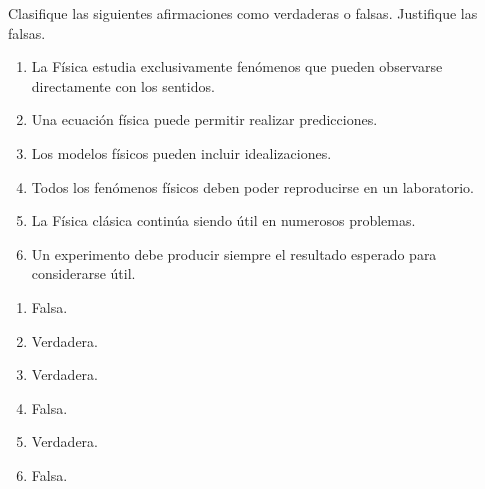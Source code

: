 \begin{ejercicio}
Clasifique las siguientes afirmaciones como verdaderas o falsas. Justifique las falsas.

\begin{enumerate}[label=\alph*)]
    \item La Física estudia exclusivamente fenómenos que pueden observarse directamente con los sentidos.
    \item Una ecuación física puede permitir realizar predicciones.
    \item Los modelos físicos pueden incluir idealizaciones.
    \item Todos los fenómenos físicos deben poder reproducirse en un laboratorio.
    \item La Física clásica continúa siendo útil en numerosos problemas.
    \item Un experimento debe producir siempre el resultado esperado para considerarse útil.
\end{enumerate}
\end{ejercicio}

\begin{respuesta}
\begin{enumerate}[label=\alph*)]
    \item Falsa.
    \item Verdadera.
    \item Verdadera.
    \item Falsa.
    \item Verdadera.
    \item Falsa.
\end{enumerate}
\end{respuesta}

